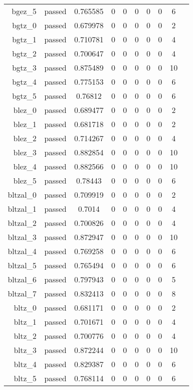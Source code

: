 \begin{longtable}{r|ccccccccc}
    bgez\_5 & passed & 0.765585 & 0 & 0 & 0 & 0 & 0 & 6 \\
    bgtz\_0 & passed & 0.679978 & 0 & 0 & 0 & 0 & 0 & 2 \\
    bgtz\_1 & passed & 0.710781 & 0 & 0 & 0 & 0 & 0 & 4 \\
    bgtz\_2 & passed & 0.700647 & 0 & 0 & 0 & 0 & 0 & 4 \\
    bgtz\_3 & passed & 0.875489 & 0 & 0 & 0 & 0 & 0 & 10 \\
    bgtz\_4 & passed & 0.775153 & 0 & 0 & 0 & 0 & 0 & 6 \\
    bgtz\_5 & passed & 0.76812 & 0 & 0 & 0 & 0 & 0 & 6 \\
    blez\_0 & passed & 0.689477 & 0 & 0 & 0 & 0 & 0 & 2 \\
    blez\_1 & passed & 0.681718 & 0 & 0 & 0 & 0 & 0 & 2 \\
    blez\_2 & passed & 0.714267 & 0 & 0 & 0 & 0 & 0 & 4 \\
    blez\_3 & passed & 0.882854 & 0 & 0 & 0 & 0 & 0 & 10 \\
    blez\_4 & passed & 0.882566 & 0 & 0 & 0 & 0 & 0 & 10 \\
    blez\_5 & passed & 0.78443 & 0 & 0 & 0 & 0 & 0 & 6 \\
    bltzal\_0 & passed & 0.709919 & 0 & 0 & 0 & 0 & 0 & 2 \\
    bltzal\_1 & passed & 0.7014 & 0 & 0 & 0 & 0 & 0 & 4 \\
    bltzal\_2 & passed & 0.700826 & 0 & 0 & 0 & 0 & 0 & 4 \\
    bltzal\_3 & passed & 0.872947 & 0 & 0 & 0 & 0 & 0 & 10 \\
    bltzal\_4 & passed & 0.769258 & 0 & 0 & 0 & 0 & 0 & 6 \\
    bltzal\_5 & passed & 0.765494 & 0 & 0 & 0 & 0 & 0 & 6 \\
    bltzal\_6 & passed & 0.797943 & 0 & 0 & 0 & 0 & 0 & 5 \\
    bltzal\_7 & passed & 0.832413 & 0 & 0 & 0 & 0 & 0 & 8 \\
    bltz\_0 & passed & 0.681171 & 0 & 0 & 0 & 0 & 0 & 2 \\
    bltz\_1 & passed & 0.701671 & 0 & 0 & 0 & 0 & 0 & 4 \\
    bltz\_2 & passed & 0.700776 & 0 & 0 & 0 & 0 & 0 & 4 \\
    bltz\_3 & passed & 0.872244 & 0 & 0 & 0 & 0 & 0 & 10 \\
    bltz\_4 & passed & 0.829387 & 0 & 0 & 0 & 0 & 0 & 6 \\
    bltz\_5 & passed & 0.768114 & 0 & 0 & 0 & 0 & 0 & 6 \\

\end{longtable}
